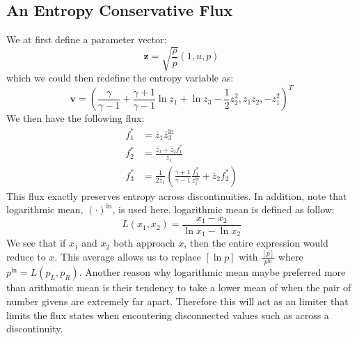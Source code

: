 \documentclass[a4paper]{article}
\numberwithin{equation}{section}
\begin{document}
\subsection{An Entropy Conservative Flux}
We at first define a parameter vector:
\begin{equation}
    \mathbf{z} = \sqrt{\frac{\rho}{p}} (1, u, p)
\end{equation}
which we could then redefine the entropy variable as:
\begin{equation}
    \mathbf{v} = \left(\frac{\gamma}{\gamma - 1} + \frac{\gamma + 1}{\gamma -1} \ln z_1 + \ln z_3 - \frac{1}{2} z_2^2, z_1 z_2, -z_1^2\right)^T
\end{equation}
We then have the following flux:
\begin{equation}
    \begin{split}
        f_1^* &= \bar{z}_1 \bar{z}_3^{\ln}\\
        f_2^* &= \frac{\bar{z}_3 + \bar{z}_2 f_1^*}{\bar{z}_1}\\
        f_3^* &= \frac{1}{2\bar{z}_1}\left(\frac{\gamma + 1}{\gamma -1} \frac{f_1^*}{z_1^{\ln}} + \bar{z}_2 f_2^* \right)
    \end{split}
\end{equation}
This flux exactly preserves entropy across discontinuities. In addition, note that logarithmic mean, $(\cdot)^{\ln}$, is used here. 
logarithmic mean is defined as follow:
\begin{equation}
    L(x_1,x_2) = \frac{x_1 - x_2}{\ln x_1 - \ln x_2}
\end{equation}
We see that if $x_1$ and $x_2$ both approach $x$, then the entire expression would reduce to $x$. This average allows us to replace $\left[\ln p\right]$ with $\frac{\left[p\right]}{p^{\ln}}$ where $p^{\ln} = L(p_L,p_R)$.
Another reason why logarithmic mean maybe preferred more than arithmatic mean is their tendency to take a lower mean of when the pair of number givens are extremely far apart. Therefore this will act as an limiter that limits the flux states when encoutering disconnected values such as across a discontinuity. 
\end{document}
